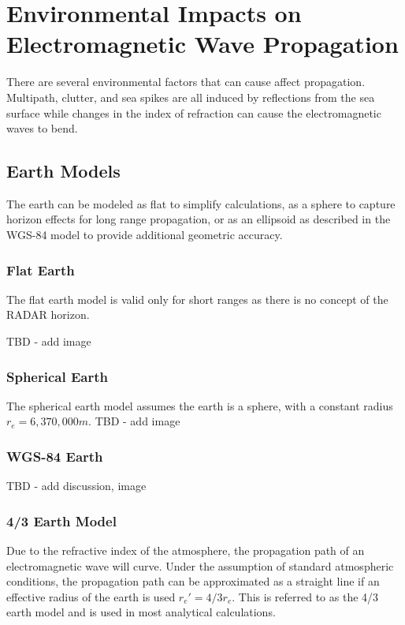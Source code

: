 \renewcommand{\baselinestretch}{2} \small\normalsize
\chapter{Environmental Impacts on Electromagnetic Wave Propagation}
There are several environmental factors that can cause affect propagation. Multipath, clutter, and sea spikes are all induced by reflections from the sea surface while changes in the index of refraction can cause the electromagnetic waves to bend. 

\section{Earth Models}
The earth can be modeled as flat to simplify calculations, as a sphere to capture horizon effects for long range propagation, or as an ellipsoid as described in the WGS-84 model to provide additional geometric accuracy.

\subsection{Flat Earth}
The flat earth model is valid only for short ranges as there is no concept of the RADAR horizon.

TBD - add image

\subsection{Spherical Earth}
The spherical earth model assumes the earth is a sphere, with a constant radius $r_e = 6,370,000 m$.
TBD - add image

\subsection{WGS-84 Earth}
TBD - add discussion, image

\subsection{4/3 Earth Model}
Due to the refractive index of the atmosphere, the propagation path of an electromagnetic wave will curve. Under the assumption of standard atmospheric conditions, the propagation path can be approximated as a straight line if an effective radius of the earth is used $r_e' = 4/3 r_e$. This is referred to as the 4/3 earth model \cite{blake_radar} and is used in most analytical calculations.

